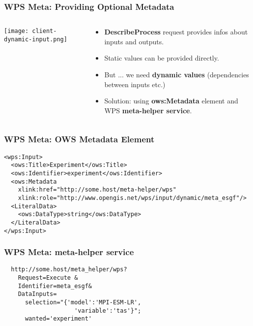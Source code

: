 \documentclass{beamer}
\begin{document}
\begin{frame}
\frametitle<presentation>{WPS Meta: Providing Optional Metadata}

  \begin{columns}[c]
    \begin{column}{.5\textwidth}
      \centering
      \texttt{[image: client-dynamic-input.png]}
    \end{column}
    \begin{column}{.5\textwidth}
      \begin{itemize}
        \item {\bf DescribeProcess} request provides infos about inputs and outputs.
        \item Static values can be provided directly.
        \item But ... we need {\bf dynamic values} (dependencies between inputs etc.)
        \item Solution: using {\bf ows:Metadata} element and WPS {\bf meta-helper service}.
      \end{itemize}
    \end{column}
  \end{columns}

\end{frame}

\begin{frame}[fragile]
\frametitle<presentation>{WPS Meta: OWS Metadata Element}
  \lstset{language=XML}
  {\scriptsize
  \begin{lstlisting}
<wps:Input>
  <ows:Title>Experiment</ows:Title>
  <ows:Identifier>experiment</ows:Identifier>
  <ows:Metadata
    xlink:href="http://some.host/meta-helper/wps"
    xlink:role="http://www.opengis.net/wps/input/dynamic/meta_esgf"/>
  <LiteralData>
    <ows:DataType>string</ows:DataType>
  </LiteralData>
</wps:Input>
  \end{lstlisting}}

\end{frame}

\begin{frame}[fragile]
\frametitle<presentation>{WPS Meta: meta-helper service}

  \lstset{language=XML}
  \begin{lstlisting}
  http://some.host/meta_helper/wps?
    Request=Execute &
    Identifier=meta_esgf&
    DataInputs=
      selection="{'model':'MPI-ESM-LR',
                    'variable':'tas'}";
      wanted='experiment'
  \end{lstlisting}

\end{frame}
\end{document}
